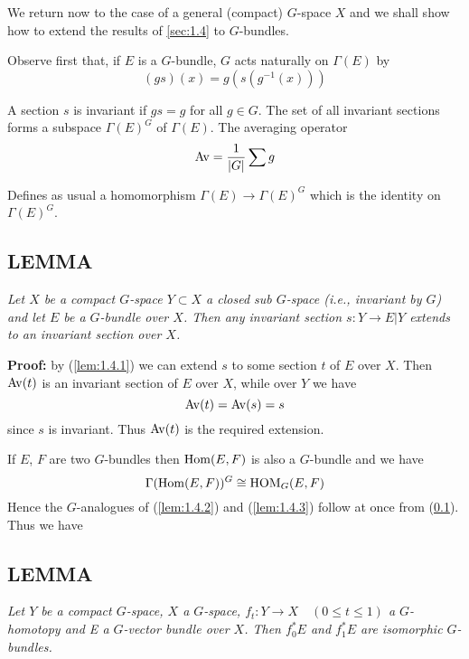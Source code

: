 We return now to the case of a general (compact) $G$-space $X$ and we shall show how to extend the results of \cref{sec:1.4} to $G$-bundles. \par 

Observe first that, if $E$ is a $G$-bundle, $G$ acts naturally on $\Gamma(E)$ by
\begin{equation*}
    (gs)(x) = g(s(g^{-1}(x)))
\end{equation*}

A section $s$ is invariant if $gs = g$ for all $g \in G$. The set of all invariant sections forms a subspace $\Gamma(E)^G$ of $\Gamma(E)$. The averaging operator
\begin{equation*}
    \operatorname{Av} = \frac{1}{|G|} \sum g
\end{equation*}

Defines as usual a homomorphism $\Gamma(E) \to \Gamma(E)^G$ which is the identity on $\Gamma(E)^G$.

\subsection{LEMMA}\label{lem:1.6.3} \textit{Let $X$ be a compact $G$-space $Y \subset X$ a closed sub $G$-space (i.e., invariant by $G$) and let $E$ be a $G$-bundle over $X$. Then any invariant section $s: Y \to E \vert Y$ extends to an invariant section over $X$.} \par 

\textbf{Proof:} by (\ref{lem:1.4.1}) we can extend $s$ to some section $t$ of $E$ over $X$. Then $\operatorname{Av}(t)$ is an invariant section of $E$ over $X$, while over $Y$ we have
\begin{equation*}
    \operatorname{Av}(t) = \operatorname{Av}(s) = s
\end{equation*}
since $s$ is invariant. Thus $\operatorname{Av}(t)$ is the required extension. \par \hfill

If $E$, $F$ are two $G$-bundles then $\operatorname{Hom}(E, F)$ is also a $G$-bundle and we have
\begin{equation*}
    \Gamma(\operatorname{Hom}(E, F))^G \cong \operatorname{HOM}_G(E, F)
\end{equation*}
Hence the $G$-analogues of (\ref{lem:1.4.2}) and (\ref{lem:1.4.3}) follow at once from (\ref{lem:1.6.3}). Thus we have

\subsection{LEMMA}\label{lem:1.6.4} \textit{Let $Y$ be a compact $G$-space, $X$ a $G$-space, $f_t: Y \to X \quad (0 \leq t \leq 1)$ a $G$-homotopy and E a $G$-vector bundle over $X$. Then $f^*_0 E$ and $f^*_1 E$ are isomorphic $G$-bundles.} \par

